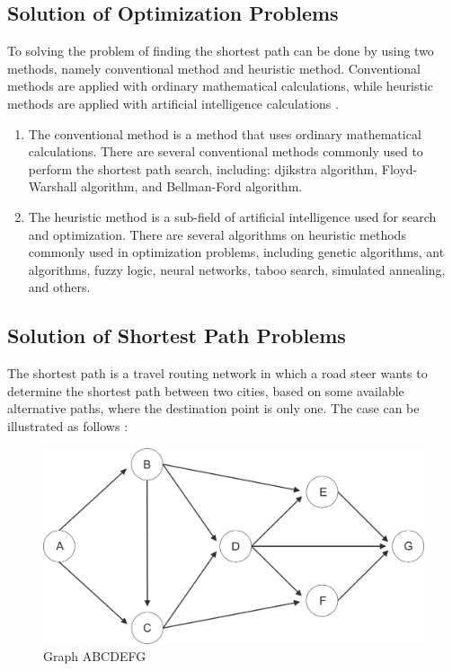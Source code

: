 \subsection{Solution of Optimization Problems}
To solving the problem of finding the shortest path can be done by using two methods, namely conventional method and heuristic method. Conventional methods are applied with ordinary mathematical calculations, while heuristic methods are applied with artificial intelligence calculations \cite{mutakhiroh2007}.
\pagebreak
\begin{enumerate}
\item The conventional method is a method that uses ordinary mathematical calculations. There are several conventional methods commonly used to perform the shortest path search, including: djikstra algorithm, Floyd-Warshall algorithm, and Bellman-Ford algorithm.

\item The heuristic method is a sub-field of artificial intelligence used for search and optimization. There are several algorithms on heuristic methods commonly used in optimization problems, including genetic algorithms, ant algorithms, fuzzy logic, neural networks, taboo search, simulated annealing, and others.
\end{enumerate}

\subsection{Solution of Shortest Path Problems}
The shortest path is a travel routing network in which a road steer wants to determine the shortest path between two cities, based on some available alternative paths, where the destination point is only one. The case can be illustrated as follows :

\begin{figure}[H]
    \centering
    \includegraphics[scale=0.5]{graph-ABCDEFG.png}
    \caption{Graph ABCDEFG}
    \label{fig:graph-ABCDEFG}
\end{figure}

